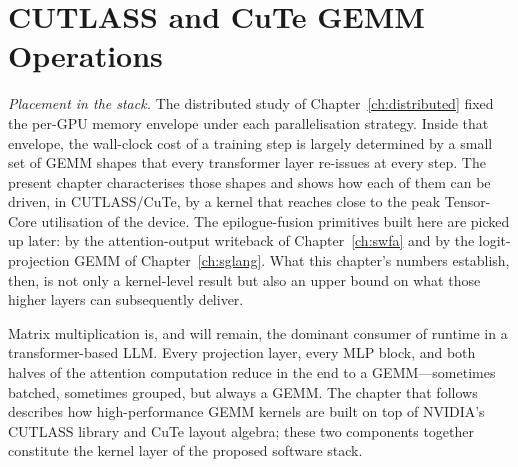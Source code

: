 \chapter{CUTLASS and CuTe GEMM Operations}\label{ch:cutlass}

\emph{Placement in the stack.} The distributed study of
Chapter~\ref{ch:distributed} fixed the per-GPU memory envelope
under each parallelisation strategy. Inside that envelope, the
wall-clock cost of a training step is largely determined by a
small set of GEMM shapes that every transformer layer re-issues at
every step. The present chapter characterises those shapes and
shows how each of them can be driven, in CUTLASS/CuTe, by a kernel
that reaches close to the peak Tensor-Core utilisation of the
device. The epilogue-fusion primitives built here are picked up
later: by the attention-output writeback of Chapter~\ref{ch:swfa}
and by the logit-projection GEMM of Chapter~\ref{ch:sglang}. What
this chapter's numbers establish, then, is not only a kernel-level
result but also an upper bound on what those higher layers can
subsequently deliver.

Matrix multiplication is, and will remain, the dominant consumer of
runtime in a transformer-based LLM. Every projection layer, every
MLP block, and both halves of the attention computation reduce in
the end to a GEMM---sometimes batched, sometimes grouped, but
always a GEMM. The chapter that follows describes how
high-performance GEMM kernels are built on top of NVIDIA's CUTLASS
library and CuTe layout algebra; these two components together
constitute the kernel layer of the proposed software stack.

